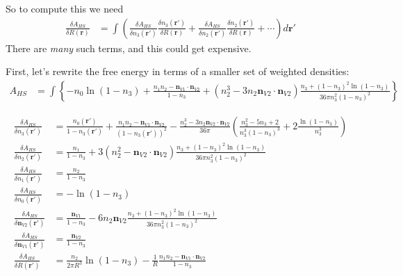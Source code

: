 \documentclass[letterpaper,twocolumn,amsmath,amssymb,jcp,10pt,aip]{revtex4-1}
\newcommand{\derivation}[1]{#1} %
\begin{document}
\derivation{
  So to compute this we need
  \begin{align}
    \frac{\delta A_{HS}}{\delta R(\mathbf{r})} &=
    \int \left(
    \frac{\delta A_{HS}}{\delta n_3(\mathbf{r}')}
    \frac{\delta n_3(\mathbf{r}')}{\delta R(\mathbf{r})}
    +
    \frac{\delta A_{HS}}{\delta n_2(\mathbf{r}')}
    \frac{\delta n_2(\mathbf{r}')}{\delta R(\mathbf{r})}
    + \cdots
    \right) d\mathbf{r}'
  \end{align}
  There are \emph{many} such terms, and this could get expensive.
  
  First, let's rewrite the free energy in terms of a smaller set of
  weighted densities:
  \begin{align}
    A_{HS} &= \int \left\{
    -n_0 \ln\left( 1 - n_3\right)
    + \frac{n_1 n_2 - \mathbf{n}_{V1} \cdot\mathbf{n}_{V2}}{1-n_3}
    + (n_2^3 - 3 n_2 \mathbf{n}_{V2} \cdot \mathbf{n}_{V2}) \frac{
      n_3 + (1-n_3)^2 \ln(1-n_3)
    }{
      36\pi n_3^2(1-n_3)^2
    }
    \right\}
  \end{align}
  
  \begin{align}
    \frac{\delta A_{HS}}{\delta n_3(\mathbf{r}')} &=
    \frac{n_0(\mathbf{r}')}{1 - n_3(\mathbf{r}')}
    + \frac{n_1n_2 - \mathbf{n}_{V1}\cdot\mathbf{n}_{V2}}{(1 -
      n_3(\mathbf{r}'))^2}
    - \frac{n_2^3 -
      3n_2\mathbf{n}_{V2}\cdot\mathbf{n}_{V2}}{36\pi}\left(
    \frac{n_3^2-5n_3+2}{n_3^3(1-n_3)^3} + 2\frac{\ln(1-n_3)}{n_3^3}
    \right)
    \\
    \frac{\delta A_{HS}}{\delta n_2(\mathbf{r}')} &=
    \frac{n_1}{1-n_3}
    + 3(n_2^2 - \mathbf{n}_{V2}\cdot\mathbf{n}_{V2})\frac{n_3 +
      (1-n_3)^2\ln(1-n_3)}{
      36\pi n_3^2(1-n_3)^2
    }
    \\
    \frac{\delta A_{HS}}{\delta n_1(\mathbf{r}')} &= \frac{n_2}{1-n_3}
    \\
    \frac{\delta A_{HS}}{\delta n_0(\mathbf{r}')} &=
    -\ln\left( 1 - n_3\right) \\
    \frac{\delta A_{HS}}{\delta \mathbf{n}_{V2}(\mathbf{r}')} &=
    \frac{\mathbf{n}_{V1}}{1-n_3}
    - 6 n_2 \mathbf{n}_{V2} \frac{n_3 +
      (1-n_3)^2\ln(1-n_3)}{
      36\pi n_3^2(1-n_3)^2
    }    \\
    \frac{\delta A_{HS}}{\delta \mathbf{n}_{V1}(\mathbf{r}')} &=
    \frac{\mathbf{n}_{V2}}{1-n_3} \\
    \frac{\delta A_{HS}}{\delta R(\mathbf{r}')} &=
    \frac{n_2}{2\pi R^3} \ln\left( 1 - n_3\right)
    - \frac1{R} \frac{n_1n_2 - \mathbf{n}_{V1} \cdot\mathbf{n}_{V2}}{1-n_3}
  \end{align}

}
\end{document}
